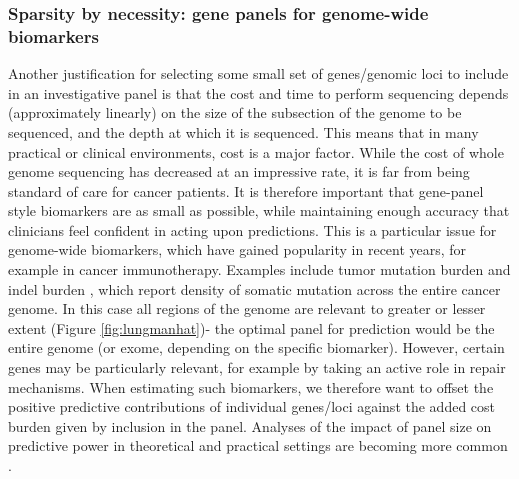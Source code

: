 \documentclass[thesis.tex]{subfiles}
\begin{document}
\subsubsection{Sparsity by necessity: gene panels for genome-wide biomarkers}
Another justification for selecting some small set of genes/genomic loci to include in an investigative panel is that the cost and time to perform sequencing depends (approximately linearly) on the size of the subsection of the genome to be sequenced, and the depth at which it is sequenced. This means that in many practical or clinical environments, cost is a major factor. While the cost of whole genome sequencing has decreased at an impressive rate, it is far from being standard of care for cancer patients. It is therefore important that gene-panel style biomarkers are as small as possible, while maintaining enough accuracy that clinicians feel confident in acting upon predictions. This is a particular issue for genome-wide biomarkers, which have gained popularity in recent years, for example in cancer immunotherapy. Examples include tumor mutation burden  \citep{cao_high_2019, samstein_tumor_2019, zhu_association_2019} and indel burden \citep{turajlic_insertion-and-deletion-derived_2017, wu_tumor_2019}, which report density of somatic mutation across the entire cancer genome. In this case all regions of the genome are relevant to greater or lesser extent (Figure \ref{fig:lungmanhat})- the optimal panel for prediction would be the entire genome (or exome, depending on the specific biomarker). However, certain genes may be particularly relevant, for example by taking an active role in  repair mechanisms. When estimating such biomarkers, we therefore want to offset the positive predictive contributions of individual genes/loci against the added cost burden given by inclusion in the panel. Analyses of the impact of panel size on predictive power in theoretical and practical settings are becoming more common \citep{budczies_optimizing_2019}.
\end{document}
